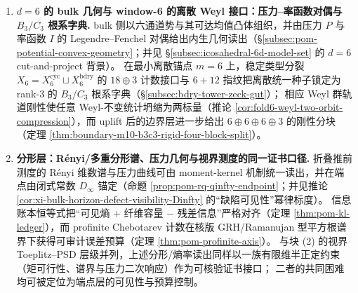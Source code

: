 \begin{enumerate}
  \item \textbf{\texorpdfstring{$d=6$}{d=6} 的 bulk 几何与 window-6 的离散 Weyl 接口：压力--率函数对偶与 \texorpdfstring{$B_3/C_3$}{B3/C3} 根系字典.}
  bulk 侧以六通道势与其可达均值凸体组织，并由压力 \(P\) 与率函数 \(I\) 的 Legendre--Fenchel 对偶给出内生几何读出（\S\ref{subsec:pom-potential-convex-geometry}；并见 \S\ref{subsec:icosahedral-6d-model-set} 的 \(d=6\) cut-and-project 背景）。
  在最小离散锚点 \(m=6\) 上，稳定类型分裂 \(X_6=X_6^{\mathrm{cyc}}\sqcup X_6^{\mathrm{bdry}}\) 的 \(18\oplus 3\) 计数接口与 \(6+12\) 指纹把离散统一种子锁定为 rank-\(3\) 的 \(B_3/C_3\) 根系字典（\S\ref{subsec:bdry-tower-zeck-gut}）；
  相应 Weyl 群轨道刚性使任意 Weyl-不变统计坍缩为两标量（推论 \ref{cor:fold6-weyl-two-orbit-compression}），而 uplift 后的边界层进一步给出 \(6\oplus 6\oplus 6\oplus 3\) 的刚性分块（定理 \ref{thm:boundary-m10-b3c3-rigid-four-block-split}）。

  \item \textbf{分形层：Rényi/多重分形谱、压力几何与视界测度的同一证书口径.}
  折叠推前测度的 Rényi 维数谱与压力曲线可由 moment-kernel 机制统一读出，并在端点由闭式常数 \(D_\infty\) 锚定（命题 \ref{prop:pom-rq-qinfty-endpoint}；并见推论 \ref{cor:xi-bulk-horizon-defect-visibility-Dinfty} 的“缺陷可见性”幂律标度）。
  信息账本恒等式把“可见熵 + 纤维容量 \(-\) 残差信息”严格对齐（定理 \ref{thm:pom-kl-ledger}），而 profinite Chebotarev 计数在核版 GRH/Ramanujan 型平方根谱界下获得可审计误差预算（定理 \ref{thm:pom-profinite-axis}）。
  与块 (2) 的视界 Toeplitz--PSD 层级并列，上述分形/熵率读出同样以一族有限维半正定约束（矩可行性、谱界与压力二次响应）作为可核验证书接口；
  二者的共同困难均可被定位为端点层的可见性与预算控制。


\end{enumerate}

